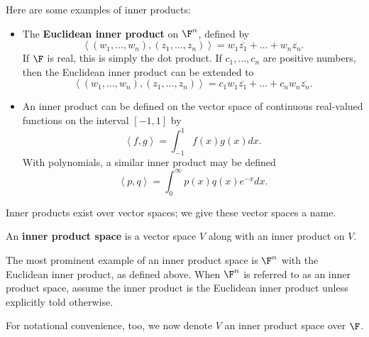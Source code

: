 \documentclass[math0540-lecture-notes.tex]{subfiles}
\begin{document}
\begin{example}
  Here are some examples of inner products:
  \begin{itemize}
    \item The \textbf{Euclidean inner product} on $\F^n$, defined by \[
        \left<(w_1,\ldots,w_n),(z_1,\ldots,z_n) \right>=w_1\overline{z_1}+\ldots+w_n\overline{z_n}
      .\] If $\F$ is real, this is simply the dot product. If $c_1,\ldots,c_n$ are positive numbers,
      then the Euclidean inner product can be extended to \[
          \left<(w_1,\ldots,w_n),(z_1,\ldots,z_n)
          \right>=c_1w_1\overline{z_1}+\ldots+c_nw_n\overline{z_n}
      .\] 
  \item An inner product can be defined on the vector space of continuous real-valued functions on
    the interval $[-1,1]$ by \[
      \left<f,g \right>=\int_{-1}^1 f(x)g(x)dx
    .\] With polynomials, a similar inner product may be defined \[
    \left<p,q \right> = \int_0^\infty p(x)q(x)e^{-x}dx
    .\] 
  \end{itemize}
\end{example}

Inner products exist over vector spaces; we give these vector spaces a name.
\begin{definition}{}
  An \textbf{inner product space} is a vector space $V$ along with an inner product on $V$.
\end{definition}

The most prominent example of an inner product space is $\F^{n}$ with the Euclidean inner product,
as defined above. When $\F^{n}$ is referred to as an inner product space, assume the inner product
is the Euclidean inner product unless explicitly told otherwise.

For notational convenience, too, we now denote $V$ an inner product space over $\F$.
\end{document}

